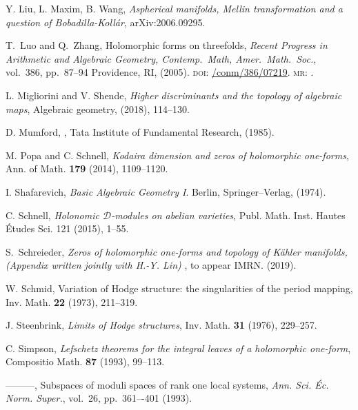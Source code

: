\documentclass[a4paper,12pt,reqno]{amsart}
\theoremstyle{plain}
\theoremstyle{definition}
\theoremstyle{remark}
\begin{document}
\begin{thebibliography}{HKLR}

 Y. Liu, L. Maxim, B. Wang, \textit{Aspherical manifolds, Mellin transformation and a question of Bobadilla-Koll\'ar}, arXiv:2006.09295.

 T.\ Luo and Q.\ Zhang, Holomorphic forms on threefolds, \textit{Recent Progress in Arithmetic and Algebraic Geometry, Contemp.\ Math, Amer.\ Math.\ Soc.}, vol.\ 386, pp.\ 87--94 Providence, RI, (2005). 
\textsc{doi}: \href{https://doi.org/org/10.1090/conm/386/07219}{/conm/386/07219}.
\textsc{mr}: \href{http://www.ams.org/mathscinet-getitem?mr=2182772}{}.

 L. Migliorini and V. Shende, \textit{Higher discriminants and the topology of algebraic maps}, Algebraic geometry, (2018), 114--130.

 D. Mumford, , Tata Institute of Fundamental Research, (1985).

 M. Popa and C. Schnell, \textit{Kodaira dimension and zeros of holomorphic one-forms}, Ann. of Math. \textbf{179} (2014), 1109--1120.


 I. Shafarevich, \textit{Basic Algebraic Geometry I}. Berlin, Springer--Verlag, (1974).

C. Schnell, {\it  Holonomic $\mathcal{D}$-modules on abelian varieties},
Publ. Math. Inst. Hautes \'{E}tudes Sci. 121 (2015), 1--55.

 S.\ Schreieder, \textit{Zeros of holomorphic one-forms and topology of K\"ahler manifolds, (Appendix written jointly with H.-Y. Lin) }, to appear IMRN. (2019).

 W. Schmid, Variation of Hodge structure: the singularities of the period mapping, Inv. Math. \textbf{22} (1973), 211--319.

 J. Steenbrink, \textit{Limits of Hodge structures}, Inv. Math. \textbf{31} (1976), 229--257.




 C. Simpson, \textit{Lefschetz theorems for the integral leaves of a holomorphic one-form}, Compositio Math. \textbf{87} (1993), 99--113.

 ---------, Subspaces of moduli spaces of rank one local systems, \textit{Ann. Sci. \'Ec. Norm. Super.}, vol.\ 26,
pp.\ 361–-401 (1993).


\end{thebibliography}
\end{document}
